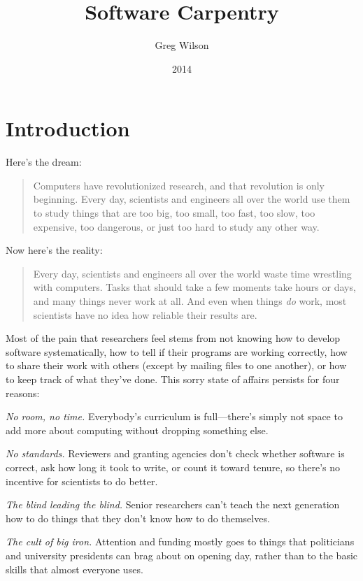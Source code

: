 \documentclass{book}
\title{Software Carpentry}
\author{Greg Wilson}
\date{2014}
\begin{document}
\frontmatter


\tableofcontents

\mainmatter

\chapter{Introduction}\label{introduction}

Here's the dream:

\begin{quote}
Computers have revolutionized research, and that revolution is only
beginning. Every day, scientists and engineers all over the world use
them to study things that are too big, too small, too fast, too slow,
too expensive, too dangerous, or just too hard to study any other way.
\end{quote}

Now here's the reality:

\begin{quote}
Every day, scientists and engineers all over the world waste time
wrestling with computers. Tasks that should take a few moments take
hours or days, and many things never work at all. And even when things
\emph{do} work, most scientists have no idea how reliable their results
are.
\end{quote}

Most of the pain that researchers feel stems from not knowing how to
develop software systematically, how to tell if their programs are
working correctly, how to share their work with others (except by
mailing files to one another), or how to keep track of what they've
done. This sorry state of affairs persists for four reasons:

\begin{swcitemize}
\item
  \emph{No room, no time.} Everybody's curriculum is full---there's
  simply not space to add more about computing without dropping
  something else.
\item
  \emph{No standards.} Reviewers and granting agencies don't check
  whether software is correct, ask how long it took to write, or count
  it toward tenure, so there's no incentive for scientists to do better.
\item
  \emph{The blind leading the blind.} Senior researchers can't teach the
  next generation how to do things that they don't know how to do
  themselves.
\item
  \emph{The cult of big iron.} Attention and funding mostly goes to
  things that politicians and university presidents can brag about on
  opening day, rather than to the basic skills that almost everyone
  uses.
\end{swcitemize}
\end{document}
